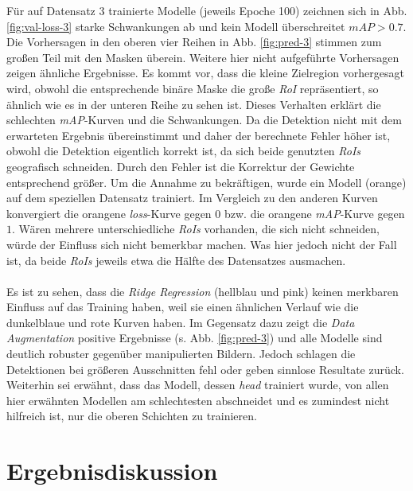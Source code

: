 Für auf Datensatz 3 trainierte Modelle (jeweils Epoche 100) zeichnen sich in  Abb. \ref{fig:val-loss-3} starke Schwankungen ab und kein Modell überschreitet $mAP>0.7$. Die Vorhersagen in den oberen vier Reihen in Abb. \ref{fig:pred-3} stimmen zum großen Teil mit den Masken überein. Weitere hier nicht aufgeführte Vorhersagen zeigen ähnliche Ergebnisse. Es kommt vor, dass die kleine Zielregion vorhergesagt wird, obwohl die entsprechende binäre Maske die große \textit{RoI} repräsentiert, so ähnlich wie es in der unteren Reihe zu sehen ist. Dieses Verhalten erklärt die schlechten \textit{mAP}-Kurven und die Schwankungen. Da die Detektion nicht mit dem erwarteten Ergebnis übereinstimmt und daher der berechnete Fehler höher ist, obwohl die Detektion eigentlich korrekt ist, da sich beide genutzten \textit{RoIs} geografisch schneiden. Durch den Fehler ist die Korrektur der Gewichte entsprechend größer. Um die Annahme zu bekräftigen, wurde ein Modell (orange) auf dem speziellen Datensatz trainiert. Im Vergleich zu den anderen Kurven konvergiert die orangene \textit{loss}-Kurve gegen $0$ bzw. die orangene \textit{mAP}-Kurve gegen $1$. Wären mehrere unterschiedliche \textit{RoIs} vorhanden, die sich nicht schneiden, würde der Einfluss sich nicht bemerkbar machen. Was hier jedoch nicht der Fall ist, da beide \textit{RoIs} jeweils etwa die Hälfte des Datensatzes ausmachen.
\\\\
Es ist zu sehen, dass die \textit{Ridge Regression} (hellblau und pink) keinen merkbaren Einfluss auf das Training haben, weil sie einen ähnlichen Verlauf wie die dunkelblaue und rote Kurven haben. Im Gegensatz dazu zeigt die \textit{Data Augmentation} positive Ergebnisse (s. Abb. \ref{fig:pred-3}) und alle Modelle sind deutlich robuster gegenüber manipulierten Bildern. Jedoch schlagen die Detektionen bei größeren Ausschnitten fehl oder geben sinnlose Resultate zurück. Weiterhin sei erwähnt, dass das Modell, dessen \textit{head} trainiert wurde, von allen hier erwähnten Modellen am schlechtesten abschneidet und es zumindest nicht hilfreich ist, nur die oberen Schichten zu trainieren.

\section{Ergebnisdiskussion}

